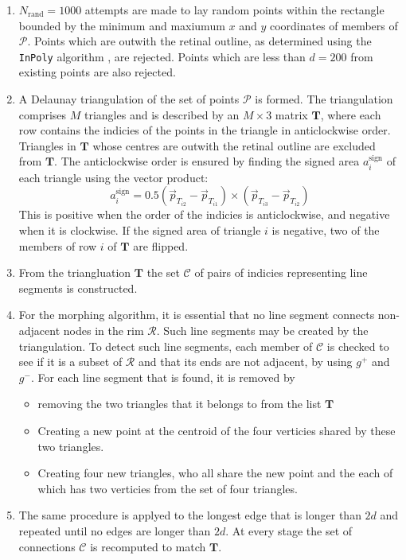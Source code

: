 \documentclass{article}
\begin{document}
\begin{enumerate}
\item $N_\mathrm{rand}=1000$ attempts are made to lay random points
  within the rectangle bounded by the minimum and maxiumum $x$ and $y$
  coordinates of members of $\mathcal{P}$.  Points which are outwith
  the retinal outline, as determined using the \texttt{InPoly}
  algorithm \citep{ORou98comp}, are rejected. Points which are less
  than $d=200$ from existing points are also rejected.
\item A Delaunay triangulation of the set of points $\mathcal{P}$ is
  formed.  The triangulation comprises $M$ triangles and is described
  by an $M\times3$ matrix $\mathbf{T}$, where each row contains the
  indicies of the points in the triangle in anticlockwise order.
  Triangles in $\mathbf{T}$ whose centres are outwith the retinal
  outline are excluded from $\mathbf{T}$. The anticlockwise order is
  ensured by finding the signed area $a^\mathrm{sign}_i$ of each
  triangle using the vector product:
  \begin{displaymath}
    a^\mathrm{sign}_i = 0.5 (\vec{p}_{T_{i2}}-\vec{p}_{T_{i1}})\times
        (\vec{p}_{T_{i3}}-\vec{p}_{T_{i2}})
  \end{displaymath}
  This is positive when the order of the indicies is anticlockwise,
  and negative when it is clockwise.  If the signed area of triangle
  $i$ is negative, two of the members of row $i$ of $\mathbf{T}$ are
  flipped.
\item From the triangluation $\mathbf{T}$ the set $\mathcal{C}$ of pairs of
  indicies representing line segments is constructed.
\item For the morphing algorithm, it is essential that no line segment
  connects non-adjacent nodes in the rim $\mathcal{R}$. Such line
  segments may be created by the triangulation. To detect such line
  segments, each member of $\mathcal{C}$ is checked to see if it is a
  subset of $\mathcal{R}$ and that its ends are not adjacent, by
  using $g^+$ and $g^-$. For each line segment that is found, it is
  removed by
  \begin{itemize}
  \item removing the two triangles that it belongs to from the list
    $\mathbf{T}$
  \item Creating a new point at the centroid of the four verticies
    shared by these two triangles.
  \item Creating four new triangles, who all share the new point and
    the each of which has two verticies from the set of four
    triangles.
  \end{itemize}
\item The same procedure is applyed to the longest edge that is longer
  than $2d$ and repeated until no edges are longer than $2d$. At every
  stage the set of connections $\mathcal{C}$ is recomputed to match
  $\mathbf{T}$.
\end{enumerate}
\end{document}
